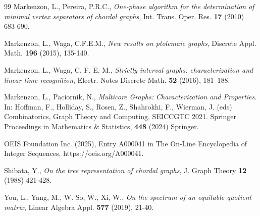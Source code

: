 \documentclass[preprint,12pt]{elsarticle}
\begin{document}
\begin{thebibliography}{99}
Markenzon, L., Pereira, P.R.C., 
{\it One-phase algorithm for the determination of minimal vertex separators of chordal graphs}, 
Int.  Trans. Oper. Res. {\bf 17} (2010) 683-690. 

Markenzon, L., Waga, C.F.E.M., 
{\it New results on ptolemaic graphs}, 
Discrete Appl. Math. {\bf 196}  (2015), 135-140.

Markenzon, L., Waga,  C. F. E. M., 
{\it Strictly interval graphs: characterization and linear time recognition}, 
Electr. Notes Discrete Math. {\bf 52} (2016), 181–188.

Markenzon, L., Paciornik, N.,
{\it Multicore Graphs: Characterization and Properties}. 
In: Hoffman, F., Holliday, S., Rosen, Z., Shahrokhi, F., Wierman, J. (eds) Combinatorics, Graph Theory and Computing. SEICCGTC 2021. Springer Proceedings in Mathematics \& Statistics, {\bf 448} (2024) Springer.

OEIS Foundation Inc. (2025), Entry A000041 in The On-Line Encyclopedia of Integer Sequences, 
https://oeis.org/A000041.

Shibata,  Y., 
{\it On the tree representation of chordal graphs},
J. Graph Theory {\bf 12} (1988) 421-428.

You, L., Yang, M., W. So, W., Xi, W.,
{\it  On the spectrum of an equitable quotient matrix}, Linear Algebra Appl. {\bf 577} (2019), 21-40.

\end{thebibliography}
\end{document}
